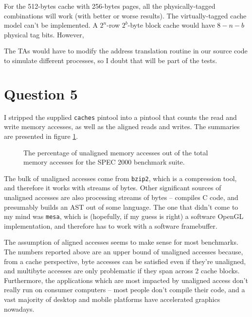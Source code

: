 For the 512-bytes cache with 256-bytes pages, all the physically-tagged
combinations will work (with better or worse results). The virtually-tagged
cache model can't be implemented. A $2^n$-row $2^b$-byte block cache would have
$8 - n - b$ physical tag bits. However,

The TAs would have to modify the address translation routine in our source code
to simulate different processes, so I doubt that will be part of the tests. 

\section{Question 5}

I stripped the supplied \texttt{caches} pintool into a pintool that counts the
read and write memory accesses, as well as the aligned reads and writes. The
summaries are presented in figure \ref{q5:unaligned_accesses}.

\begin{figure}[htb]
\center

\caption{The percentage of unaligned memory accesses out of the total memory
accesses for the SPEC 2000 benchmark suite. }
\label{q5:unaligned_accesses}
\end{figure}

The bulk of unaligned accesses come from \texttt{bzip2}, which is a compression
tool, and therefore it works with streams of bytes. Other significant sources
of unaligned accesses are also processing streams of bytes -- 
compiles C code, and  presumably builds an AST out of some
language. The one that didn't come to my mind was \texttt{mesa}, which is
(hopefully, if my guess is right) a software OpenGL implementation, and
therefore has to work with a software framebuffer.

The assumption of aligned accesses seems to make sense for most benchmarks. The
numbers reported above are an upper bound of unaligned accesses because, from a
cache perspective, byte accesses can be satisfied even if they're unaligned, and
multibyte accesses are only problematic if they span across 2 cache blocks.
Furthermore, the applications which are most impacted by unaligned access don't
really run on consumer computers -- most people don't compile their code, and a
vast majority of desktop and mobile platforms have accelerated graphics
nowadays.
